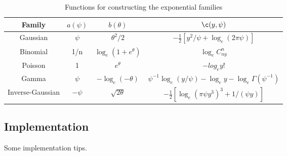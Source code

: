 \begin{table}[h]
\centering
\begin{tabular}{cccc}
Family & $a(\psi)$ & $b(\theta)$ & $\c(y, \psi)$ \\
\hline
Gaussian & $\psi$ & $\theta^2/2$ & $-\frac{1}{2}\left[y^2/\psi+\log_e(2\pi\psi)\right]$ \\
Binomial & 1/n & $\log_e(1+e^\theta)$ & $\log_eC^n_{ny}$ \\
Poisson & 1 & $e^\theta$ & $-log_ey!$ \\
Gamma & $\psi$ & $-\log_e(-\theta)$ & $\psi^{-1}\log_e(y/\psi) - \log_ey - \log_e\Gamma(\psi^{-1})$ \\
Inverse-Gaussian & $-\psi$ & $\sqrt{2\theta}$ & $-\frac{1}{2}\left[\log_e(\pi\psi y^3)^3 + 1/(\psi y) \right]$ \\
\end{tabular}
\caption{Functions for constructing the exponential families}
\label{tab:glm_func}
\end{table}

\subsection{Implementation}
Some implementation tips.

